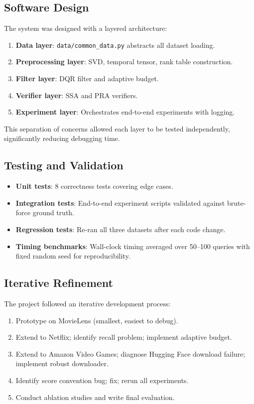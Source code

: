 \subsection{Software Design}

The system was designed with a layered architecture:
\begin{enumerate}
  \item \textbf{Data layer}: \texttt{data/common\_data.py} abstracts all dataset loading.
  \item \textbf{Preprocessing layer}: SVD, temporal tensor, rank table construction.
  \item \textbf{Filter layer}: DQR filter and adaptive budget.
  \item \textbf{Verifier layer}: SSA and PRA verifiers.
  \item \textbf{Experiment layer}: Orchestrates end-to-end experiments with logging.
\end{enumerate}

This separation of concerns allowed each layer to be tested independently, significantly reducing debugging time.

\subsection{Testing and Validation}

\begin{itemize}
  \item \textbf{Unit tests}: 8 correctness tests covering edge cases.
  \item \textbf{Integration tests}: End-to-end experiment scripts validated against brute-force ground truth.
  \item \textbf{Regression tests}: Re-ran all three datasets after each code change.
  \item \textbf{Timing benchmarks}: Wall-clock timing averaged over 50--100 queries with fixed random seed for reproducibility.
\end{itemize}

\subsection{Iterative Refinement}

The project followed an iterative development process:
\begin{enumerate}
  \item Prototype on MovieLens (smallest, easiest to debug).
  \item Extend to Netflix; identify recall problem; implement adaptive budget.
  \item Extend to Amazon Video Games; diagnose Hugging Face download failure; implement robust downloader.
  \item Identify score convention bug; fix; rerun all experiments.
  \item Conduct ablation studies and write final evaluation.
\end{enumerate}

